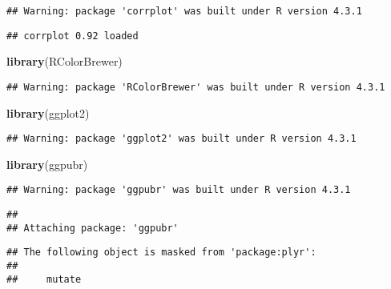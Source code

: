 \documentclass[
]{article}
\newenvironment{Shaded}{\begin{snugshade}}{\end{snugshade}}
\newcommand{\FunctionTok}[1]{\textcolor[rgb]{0.13,0.29,0.53}{\textbf{#1}}}
\newcommand{\NormalTok}[1]{#1}
\begin{document}
\begin{verbatim}
## Warning: package 'corrplot' was built under R version 4.3.1
\end{verbatim}

\begin{verbatim}
## corrplot 0.92 loaded
\end{verbatim}

\begin{Shaded}
\begin{Highlighting}[]
\FunctionTok{library}\NormalTok{(RColorBrewer)}
\end{Highlighting}
\end{Shaded}

\begin{verbatim}
## Warning: package 'RColorBrewer' was built under R version 4.3.1
\end{verbatim}

\begin{Shaded}
\begin{Highlighting}[]
\FunctionTok{library}\NormalTok{(ggplot2)}
\end{Highlighting}
\end{Shaded}

\begin{verbatim}
## Warning: package 'ggplot2' was built under R version 4.3.1
\end{verbatim}

\begin{Shaded}
\begin{Highlighting}[]
\FunctionTok{library}\NormalTok{(ggpubr)}
\end{Highlighting}
\end{Shaded}

\begin{verbatim}
## Warning: package 'ggpubr' was built under R version 4.3.1
\end{verbatim}

\begin{verbatim}
## 
## Attaching package: 'ggpubr'
\end{verbatim}

\begin{verbatim}
## The following object is masked from 'package:plyr':
## 
##     mutate
\end{verbatim}
\end{document}
